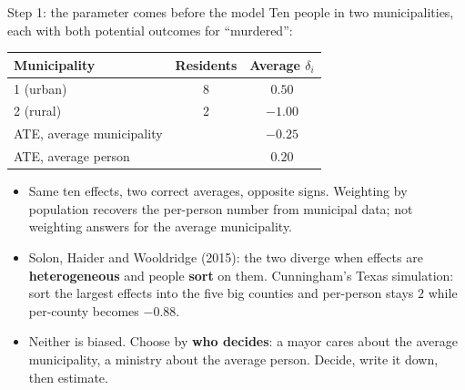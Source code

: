 \documentclass[
  11pt,
  ignorenonframetext,
  aspectratio=169,
]{beamer}
\providecommand{\tightlist}{%
  \setlength{\itemsep}{0pt}\setlength{\parskip}{0pt}}
\begin{document}
\begin{frame}{Step 1: the parameter comes before the model}
\protect{}\label{step-1-the-parameter-comes-before-the-model}
Ten people in two municipalities, each with both potential outcomes for
``murdered'':

\begin{center}\scriptsize
\begin{tabular}{lcc}
\toprule
Municipality & Residents & Average $\delta_i$ \\
\midrule
1 (urban) & 8 & $0.50$ \\
2 (rural) & 2 & $-1.00$ \\
\midrule
ATE, average municipality & & $-0.25$ \\
ATE, average person & & $0.20$ \\
\bottomrule
\end{tabular}
\end{center}

\begin{itemize}
\tightlist
\item
  Same ten effects, two correct averages, opposite signs. Weighting by
  population recovers the per-person number from municipal data; not
  weighting answers for the average municipality.
\item
  Solon, Haider and Wooldridge (2015): the two diverge when effects are
  \textbf{heterogeneous} and people \textbf{sort} on them. Cunningham's
  Texas simulation: sort the largest effects into the five big counties
  and per-person stays \(2\) while per-county becomes \(-0.88\).
\item
  Neither is biased. Choose by \textbf{who decides}: a mayor cares about
  the average municipality, a ministry about the average person. Decide,
  write it down, then estimate.
\end{itemize}
\end{frame}
\end{document}
